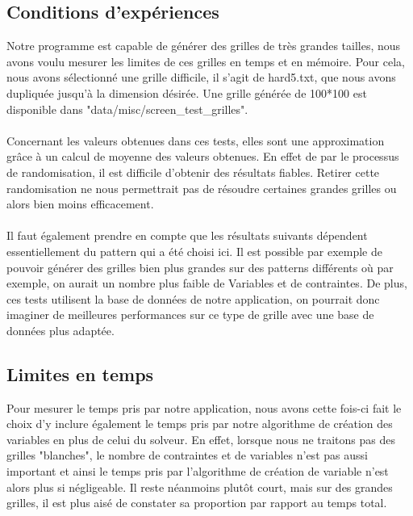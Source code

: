 \documentclass [ 11 pt ] {article}
\begin{document}
        \subsection{Conditions d'expériences}  
            Notre programme est capable de générer des grilles de très grandes tailles, nous avons voulu mesurer les limites de ces grilles en temps et en mémoire. Pour cela, nous avons sélectionné une grille difficile, il s'agit de hard5.txt, que nous avons dupliquée jusqu'à la dimension désirée. Une grille générée de 100*100 est disponible dans "data/misc/screen\_test\_grilles".
            \\\\
            Concernant les valeurs obtenues dans ces tests, elles sont une approximation grâce à un calcul de moyenne des valeurs obtenues. En effet de par le processus de randomisation, il est difficile d'obtenir des résultats fiables. Retirer cette randomisation ne nous permettrait pas de résoudre certaines grandes grilles ou alors bien moins efficacement.
            \\\\
            Il faut également prendre en compte que les résultats suivants dépendent essentiellement du pattern qui a été choisi ici. Il est possible par exemple de pouvoir générer des grilles bien plus grandes sur des patterns différents où par exemple, on aurait un nombre plus faible de Variables et de contraintes. De plus, ces tests utilisent la base de données de notre application, on pourrait donc imaginer de meilleures performances sur ce type de grille avec une base de données plus adaptée.
                    
        \subsection{Limites en temps} 
            Pour mesurer le temps pris par notre application, nous avons cette fois-ci fait le choix d'y inclure également le temps pris par notre algorithme de création des variables en plus de celui du solveur. En effet, lorsque nous ne traitons pas des grilles "blanches", le nombre de contraintes et de variables n'est pas aussi important et ainsi le temps pris par l'algorithme de création de variable n'est alors plus si négligeable. Il reste néanmoins plutôt court, mais sur des grandes grilles, il est plus aisé de constater sa proportion par rapport au temps total.
            
\end{document}
